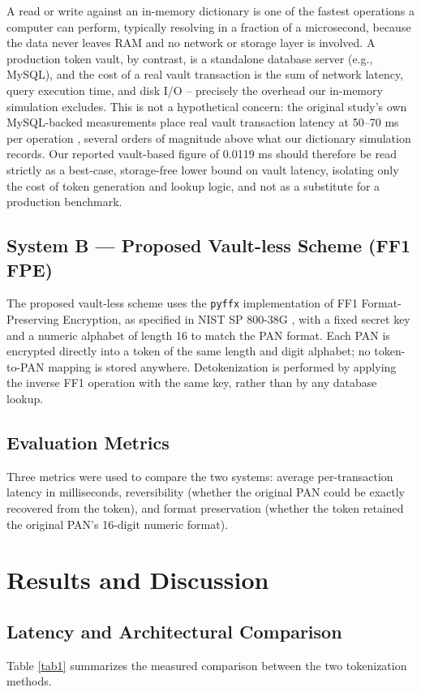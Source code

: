 \documentclass[conference]{IEEEtran}
\begin{document}
A read or write against an in-memory dictionary is one of the fastest operations a computer can perform, typically resolving in a fraction of a microsecond, because the data never leaves RAM and no network or storage layer is involved. A production token vault, by contrast, is a standalone database server (e.g., MySQL), and the cost of a real vault transaction is the sum of network latency, query execution time, and disk I/O -- precisely the overhead our in-memory simulation excludes. This is not a hypothetical concern: the original study's own MySQL-backed measurements place real vault transaction latency at 50--70 ms per operation \cite{b1}, several orders of magnitude above what our dictionary simulation records. Our reported vault-based figure of 0.0119 ms should therefore be read strictly as a best-case, storage-free lower bound on vault latency, isolating only the cost of token generation and lookup logic, and not as a substitute for a production benchmark.

\subsection{System B --- Proposed Vault-less Scheme (FF1 FPE)}
The proposed vault-less scheme uses the \texttt{pyffx} implementation of FF1 Format-Preserving Encryption, as specified in NIST SP 800-38G \cite{b4}, with a fixed secret key and a numeric alphabet of length 16 to match the PAN format. Each PAN is encrypted directly into a token of the same length and digit alphabet; no token-to-PAN mapping is stored anywhere. Detokenization is performed by applying the inverse FF1 operation with the same key, rather than by any database lookup.

\subsection{Evaluation Metrics}
Three metrics were used to compare the two systems: average per-transaction latency in milliseconds, reversibility (whether the original PAN could be exactly recovered from the token), and format preservation (whether the token retained the original PAN's 16-digit numeric format).

\section{Results and Discussion}

\subsection{Latency and Architectural Comparison}
Table \ref{tab1} summarizes the measured comparison between the two tokenization methods.
\end{document}
